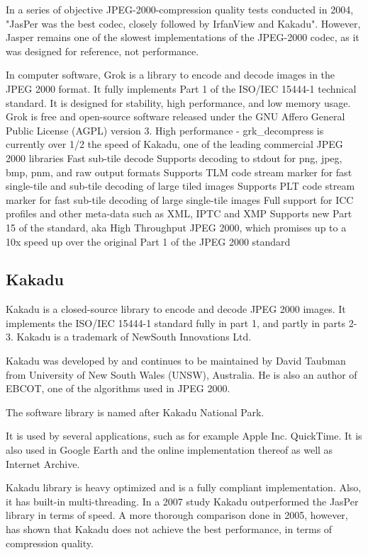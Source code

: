 In a series of objective JPEG-2000-compression quality tests conducted in 2004, "JasPer was the best codec, closely followed by IrfanView and Kakadu". However, Jasper remains one of the slowest implementations of the JPEG-2000 codec, as it was designed for reference, not performance.


In computer software, Grok is a library to encode and decode images in the JPEG 2000 format. It fully implements Part 1 of the ISO/IEC 15444-1 technical standard. It is designed for stability, high performance, and low memory usage. Grok is free and open-source software released under the GNU Affero General Public License (AGPL) version 3.
High performance - grk_decompress is currently over 1/2 the speed of Kakadu, one of the leading commercial JPEG 2000 libraries
Fast sub-tile decode
Supports decoding to stdout for png, jpeg, bmp, pnm, and raw output formats
Supports TLM code stream marker for fast single-tile and sub-tile decoding of large tiled images
Supports PLT code stream marker for fast sub-tile decoding of large single-tile images
Full support for ICC profiles and other meta-data such as XML, IPTC and XMP
Supports new Part 15 of the standard, aka High Throughput JPEG 2000, which promises up to a 10x speed up over the original Part 1 of the JPEG 2000 standard

\subsection{Kakadu}

Kakadu is a closed-source library to encode and decode JPEG 2000 images. It implements the ISO/IEC 15444-1 standard fully in part 1, and partly in parts 2-3. Kakadu is a trademark of NewSouth Innovations Ltd.

Kakadu was developed by and continues to be maintained by David Taubman from University of New South Wales (UNSW), Australia. He is also an author of EBCOT, one of the algorithms used in JPEG 2000.

The software library is named after Kakadu National Park.

It is used by several applications, such as for example Apple Inc. QuickTime. It is also used in Google Earth and the online implementation thereof as well as Internet Archive.

Kakadu library is heavy optimized and is a fully compliant implementation. Also, it has built-in multi-threading. In a 2007 study Kakadu outperformed the JasPer library in terms of speed. A more thorough comparison done in 2005, however, has shown that Kakadu does not achieve the best performance, in terms of compression quality.

